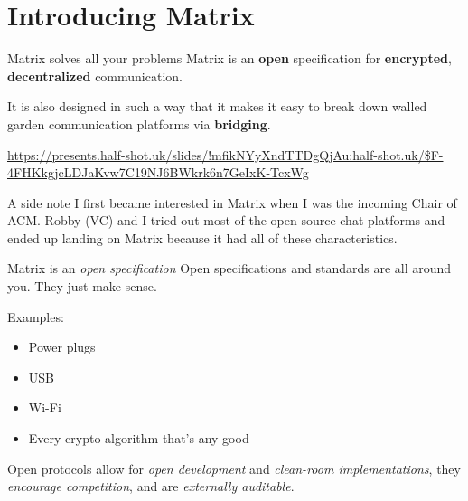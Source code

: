 \documentclass{acm}
\begin{document}
\section{Introducing Matrix}

\begin{frame}{Matrix solves all your problems}
    Matrix is an \textbf{open} specification for \textbf{encrypted},
    \textbf{decentralized} communication. \pause

    It is also designed in such a way that it makes it easy to break down walled
    garden communication platforms via \textbf{bridging}.

    \centering
    \tiny
    \url{https://presents.half-shot.uk/slides/!mfikNYyXndTTDgQjAu:half-shot.uk/$F-4FHKkgjcLDJaKvw7C19NJ6BWkrk6n7GeIxK-TcxWg}
\end{frame}

\begin{frame}{A side note}
    I first became interested in Matrix when I was the incoming Chair of ACM.
    Robby (VC) and I tried out most of the open source chat platforms and ended
    up landing on Matrix because it had all of these characteristics.
\end{frame}

\begin{frame}{Matrix is an \textit{open specification}}
    Open specifications and standards are all around you. They just make
    sense\texttrademark.

    Examples:\pause
    \begin{itemize}
        \item Power plugs
        \item USB
        \item Wi-Fi
        \item Every crypto algorithm that's any good
    \end{itemize}
    \pause

    Open protocols allow for \textit{open development} and  \textit{clean-room
    implementations}, they \textit{encourage competition}, and are
    \textit{externally auditable}.
\end{frame}
\end{document}
